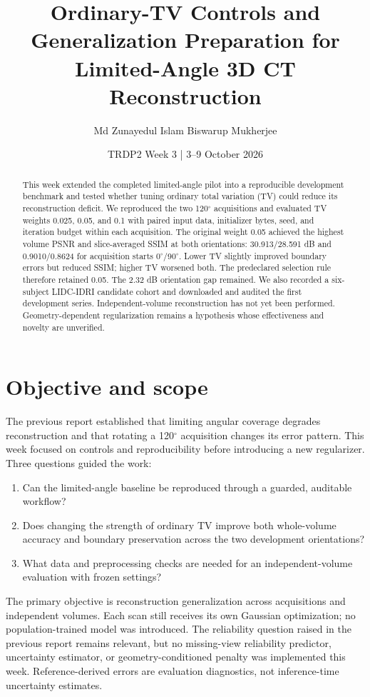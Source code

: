 \documentclass[10pt,a4paper]{article}
\title{\vspace{-1.3cm}\huge\bfseries Ordinary-TV Controls and Generalization Preparation for Limited-Angle 3D CT Reconstruction}
\author{\normalsize Md Zunayedul Islam \qquad Biswarup Mukherjee}
\date{\small TRDP2 Week 3 | 3--9 October 2026}
\begin{document}
\maketitle
\vspace{-1em}
\begin{abstract}
This week extended the completed limited-angle pilot into a reproducible development benchmark and tested whether tuning ordinary total variation (TV) could reduce its reconstruction deficit. We reproduced the two 120$^\circ$ acquisitions and evaluated TV weights 0.025, 0.05, and 0.1 with paired input data, initializer bytes, seed, and iteration budget within each acquisition. The original weight 0.05 achieved the highest volume PSNR and slice-averaged SSIM at both orientations: 30.913/28.591 dB and 0.9010/0.8624 for acquisition starts 0$^\circ$/90$^\circ$. Lower TV slightly improved boundary errors but reduced SSIM; higher TV worsened both. The predeclared selection rule therefore retained 0.05. The 2.32 dB orientation gap remained. We also recorded a six-subject LIDC-IDRI candidate cohort and downloaded and audited the first development series. Independent-volume reconstruction has not yet been performed. Geometry-dependent regularization remains a hypothesis whose effectiveness and novelty are unverified.
\end{abstract}

\section{Objective and scope}
The previous report established that limiting angular coverage degrades reconstruction and that rotating a 120$^\circ$ acquisition changes its error pattern. This week focused on controls and reproducibility before introducing a new regularizer. Three questions guided the work:
\begin{enumerate}
\item Can the limited-angle baseline be reproduced through a guarded, auditable workflow?
\item Does changing the strength of ordinary TV improve both whole-volume accuracy and boundary preservation across the two development orientations?
\item What data and preprocessing checks are needed for an independent-volume evaluation with frozen settings?
\end{enumerate}
The primary objective is reconstruction generalization across acquisitions and independent volumes. Each scan still receives its own Gaussian optimization; no population-trained model was introduced. The reliability question raised in the previous report remains relevant, but no missing-view reliability predictor, uncertainty estimator, or geometry-conditioned penalty was implemented this week. Reference-derived errors are evaluation diagnostics, not inference-time uncertainty estimates.
\end{document}
